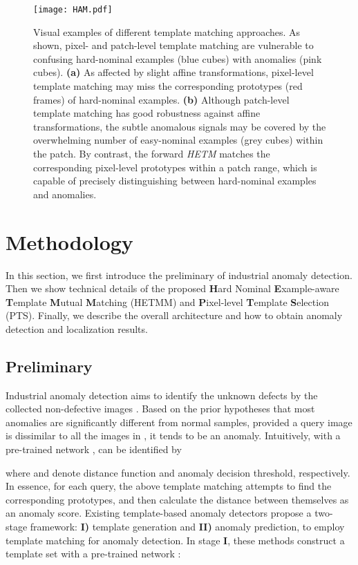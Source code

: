 \documentclass[default,iicol]{sn-jnl}\usepackage[algo2e,ruled,linesnumbered]{algorithm2e}
\theoremstyle{thmstyleone}\newtheorem{theorem}{Theorem}\newtheorem{proposition}[theorem]{Proposition}
\theoremstyle{thmstyletwo}\newtheorem{example}{Example}\newtheorem{remark}{Remark}
\theoremstyle{thmstylethree}\newtheorem{definition}{Definition}
\begin{document}
\begin{figure*}[!t]
    \centering
    \texttt{[image: HAM.pdf]}
    \caption{
        Visual examples of different template matching approaches.
        As shown, pixel- and patch-level template matching are vulnerable to confusing hard-nominal examples (blue cubes) with anomalies (pink cubes).
        \textbf{(a)} As affected by slight affine transformations, pixel-level template matching may miss the corresponding prototypes (red frames) of hard-nominal examples.
        \textbf{(b)} Although patch-level template matching has good robustness against affine transformations, the subtle anomalous signals may be covered by the overwhelming number of easy-nominal examples (grey cubes) within the patch.
        By contrast, the forward \textit{HETM} matches the corresponding pixel-level prototypes within a patch range, which is capable of precisely distinguishing between hard-nominal examples and anomalies.
    }
    \label{fig:HAM}
\end{figure*}

\section{Methodology}
In this section, we first introduce the preliminary of industrial anomaly detection.
Then we show technical details of the proposed \textbf{H}ard Nominal \textbf{E}xample-aware \textbf{T}emplate \textbf{M}utual \textbf{M}atching (HETMM) and \textbf{P}ixel-level \textbf{T}emplate \textbf{S}election (PTS).
Finally, we describe the overall architecture and how to obtain anomaly detection and localization results.

\subsection{Preliminary}\label{sec:temp_match}
Industrial anomaly detection aims to identify the unknown defects by the collected  non-defective images .
Based on the prior hypotheses that most anomalies are significantly different from normal samples, provided a query image  is dissimilar to all the images in , it tends to be an anomaly.
Intuitively, with a pre-trained network ,  can be identified by

where  and  denote distance function and anomaly decision threshold, respectively.
In essence, for each query, the above template matching attempts to find the corresponding prototypes, and then calculate the distance between themselves as an anomaly score.
Existing template-based anomaly detectors \cite{SPADE,Padim,patchcore} propose a two-stage framework: \textbf{I)} template generation and \textbf{II)} anomaly prediction, to employ template matching for anomaly detection.
In stage \textbf{I}, these methods construct a template set  with a pre-trained network :
\end{document}

